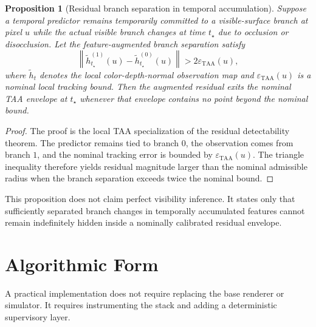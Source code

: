 \documentclass[11pt,letterpaper]{article}
\newcommand{\norm}[1]{\left\lVert #1 \right\rVert}
\theoremstyle{gcresult}
\newtheorem{proposition}[theorem]{Proposition}
\theoremstyle{definition}
\begin{document}
\begin{proposition}[Residual branch separation in temporal accumulation]
Suppose a temporal predictor remains temporarily committed to a visible-surface branch at pixel $u$ while the actual visible branch changes at time $t_\star$ due to occlusion or disocclusion. Let the feature-augmented branch separation satisfy
\begin{equation}
    \norm{\tilde h_{t_\star}^{(1)}(u) - \tilde h_{t_\star}^{(0)}(u)} > 2\varepsilon_{\mathrm{TAA}}(u),
\end{equation}
where $\tilde h_t$ denotes the local color-depth-normal observation map and $\varepsilon_{\mathrm{TAA}}(u)$ is a nominal local tracking bound. Then the augmented residual exits the nominal TAA envelope at $t_\star$ whenever that envelope contains no point beyond the nominal bound.
\end{proposition}

\begin{proof}
The proof is the local TAA specialization of the residual detectability theorem. The predictor remains tied to branch $0$, the observation comes from branch $1$, and the nominal tracking error is bounded by $\varepsilon_{\mathrm{TAA}}(u)$. The triangle inequality therefore yields residual magnitude larger than the nominal admissible radius when the branch separation exceeds twice the nominal bound.
\end{proof}

This proposition does not claim perfect visibility inference. It states only that sufficiently separated branch changes in temporally accumulated features cannot remain indefinitely hidden inside a nominally calibrated residual envelope.

\section{Algorithmic Form}

A practical implementation does not require replacing the base renderer or simulator. It requires instrumenting the stack and adding a deterministic supervisory layer.
\end{document}
